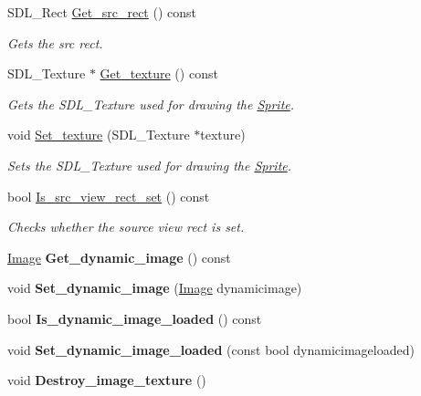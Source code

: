 \begin{DoxyCompactItemize}
S\+D\+L\+\_\+\+Rect \hyperlink{classjetfuel_1_1draw_1_1Sprite_ab3e7bda170f41633ec80408b639286db}{Get\+\_\+src\+\_\+rect} () const
\begin{DoxyCompactList}\small\item\em Gets the src rect. \end{DoxyCompactList}\item 
S\+D\+L\+\_\+\+Texture $\ast$ \hyperlink{classjetfuel_1_1draw_1_1Sprite_ad2d60845bf4e9915b162b07e0d96bf76}{Get\+\_\+texture} () const
\begin{DoxyCompactList}\small\item\em Gets the S\+D\+L\+\_\+\+Texture used for drawing the \hyperlink{classjetfuel_1_1draw_1_1Sprite}{Sprite}. \end{DoxyCompactList}\item 
void \hyperlink{classjetfuel_1_1draw_1_1Sprite_aa44e34d0f40435ad48d0bf2ccb5c25e0}{Set\+\_\+texture} (S\+D\+L\+\_\+\+Texture $\ast$texture)
\begin{DoxyCompactList}\small\item\em Sets the S\+D\+L\+\_\+\+Texture used for drawing the \hyperlink{classjetfuel_1_1draw_1_1Sprite}{Sprite}. \end{DoxyCompactList}\item 
bool \hyperlink{classjetfuel_1_1draw_1_1Sprite_a31b6b5ee62f3298577bbf78ad7b18cdf}{Is\+\_\+src\+\_\+view\+\_\+rect\+\_\+set} () const
\begin{DoxyCompactList}\small\item\em Checks whether the source view rect is set. \end{DoxyCompactList}\item 
\mbox{\label{classjetfuel_1_1draw_1_1Sprite_a9c750d8c54004aa7e9b2de82b46bdb12}} 
\hyperlink{classjetfuel_1_1draw_1_1Image}{Image} {\bfseries Get\+\_\+dynamic\+\_\+image} () const
\item 
\mbox{\label{classjetfuel_1_1draw_1_1Sprite_a0dfe3a796662980c612833768a785450}} 
void {\bfseries Set\+\_\+dynamic\+\_\+image} (\hyperlink{classjetfuel_1_1draw_1_1Image}{Image} dynamicimage)
\item 
\mbox{\label{classjetfuel_1_1draw_1_1Sprite_a06c4dbfd70dc6d52c2cea3d3f624fe83}} 
bool {\bfseries Is\+\_\+dynamic\+\_\+image\+\_\+loaded} () const
\item 
\mbox{\label{classjetfuel_1_1draw_1_1Sprite_a56b760bfd2717c203c64827128132ef8}} 
void {\bfseries Set\+\_\+dynamic\+\_\+image\+\_\+loaded} (const bool dynamicimageloaded)
\item 
\mbox{\label{classjetfuel_1_1draw_1_1Sprite_ad429e62219ac70a4285cc938f7f06800}} 
void {\bfseries Destroy\+\_\+image\+\_\+texture} ()
\end{DoxyCompactItemize}


